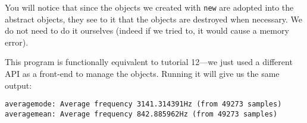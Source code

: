 You will notice that since the objects we created with \texttt{new} are adopted into the abstract objects, they see to it that the objects are destroyed when necessary. We do not need to do it ourselves (indeed if we tried to, it would cause a memory error).

This program is functionally equivalent to tutorial 12---we just used a different API as a front-end to manage the objects. Running it will give us the same output:

\begin{verbatim}
averagemode: Average frequency 3141.314391Hz (from 49273 samples)
averagemean: Average frequency 842.885962Hz (from 49273 samples)
\end{verbatim}

